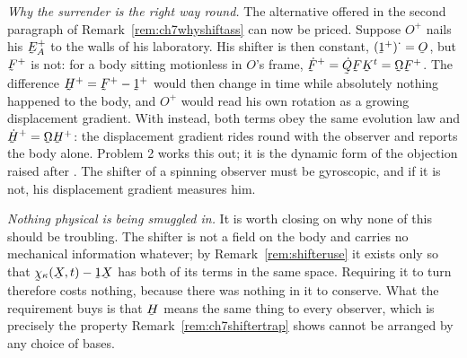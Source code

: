 \begin{remark}
\emph{Why the surrender is the right way round.} The alternative offered
in the second paragraph of Remark~\ref{rem:ch7whyshiftass} can now be
priced. Suppose $O^{+}$ nails his $\bE^{+}_{A}$ to the walls of his
laboratory. His shifter is then constant,
$(\shift^{+})^{\textstyle\cdot}=\Ob$, but $\bF^{+}$ is not: for a body
sitting motionless in $O$'s frame, $\dot\bF^{+}=\dot\bQ\bF\bK^{t}
=\bOm\bF^{+}$. The difference $\bH^{+}=\bF^{+}-\shift^{+}$ would then
change in time while absolutely nothing happened to the body, and
$O^{+}$ would read his own rotation as a growing displacement gradient.
With  instead, both terms obey the same evolution law and
$\dot\bH^{+}=\bOm\bH^{+}$: the displacement gradient rides round with the
observer and reports the body alone. Problem 2 works this out; it is the
dynamic form of the objection raised after . The shifter of a
spinning observer must be gyroscopic, and if it is not, his displacement
gradient measures him.

\emph{Nothing physical is being smuggled in.} It is worth closing on why
none of this should be troubling. The shifter is not a field on the body
and carries no mechanical information whatever; by
Remark~\ref{rem:shifteruse} it exists only so that
$\bchi_{\kappa}(\bX,t)-\shift\bX$ has both of its terms in the same
space. Requiring it to turn therefore costs nothing, because there was
nothing in it to conserve. What the requirement buys is that $\bH$ means
the same thing to every observer, which is precisely the property
Remark~\ref{rem:ch7shiftertrap} shows cannot be arranged by any choice of
bases.
\end{remark}

